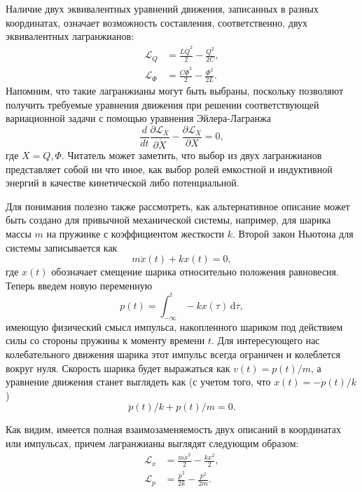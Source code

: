 \documentclass[14pt, a4paper]{extreport}
\newcommand{\diff}{\,\mathrm{d}}
\numberwithin{equation}{section}
\begin{document}
Наличие двух эквивалентных уравнений движения, записанных в разных координатах, означает возможность составления, соответственно, двух эквивалентных лагранжианов:
\begin{align}
	\mathcal{L}_Q &= \frac{L \dot Q^2}{2} - \frac{Q^2}{2 C},\\
	\mathcal{L}_\Phi &= \frac{C\dot \Phi^2}{2} - \frac{\Phi^2}{2 L}.
\end{align}
Напомним, что такие лагранжианы могут быть выбраны, поскольку позволяют получить требуемые уравнения движения при решении соответствующей вариационной задачи с помощью уравнения Эйлера-Лагранжа
\begin{equation}
\frac{d}{d t}\frac{\partial \mathcal{L}_X}{\partial \dot X} - \frac{\partial \mathcal{L}_X}{\partial X} = 0,
\end{equation}
где $X = Q, \Phi$. Читатель может заметить, что выбор из двух лагранжианов представляет собой ни что иное, как выбор ролей емкостной и индуктивной энергий в качестве кинетической либо потенциальной. 

Для понимания полезно также рассмотреть, как альтернативное описание может быть создано для привычной механической системы, например, для шарика массы $m$ на пружинке с коэффициентом жесткости $k$. Второй закон Ньютона для системы записывается как
\begin{equation}
	m \ddot x(t) + k x(t) = 0,
\end{equation}
где $x(t)$ обозначает смещение шарика относительно положения равновесия. Теперь введем новую переменную
\begin{equation}
	p(t) = \int_{-\infty}^{t} - k x(\tau) \diff \tau,
\end{equation}
имеющую физический смысл импульса, накопленного шариком под действием силы со стороны пружины к моменту времени $ t $. Для интересующего нас колебательного движения шарика этот импульс всегда ограничен и колеблется вокруг нуля. Скорость шарика будет выражаться как $v(t) = p(t)/m$, а уравнение движения станет выглядеть как (с учетом того, что $ x(t) = - \dot p(t) / k $)
\begin{equation}
	\ddot p(t)/k + p(t)/m = 0.
\end{equation}

Как видим, имеется полная взаимозаменяемость двух описаний в координатах или импульсах, причем лагранжианы выглядят следующим образом:
\begin{align}
\mathcal{L}_x &= \frac{m \dot x^2}{2} - \frac{k x^2}{2},\\
\mathcal{L}_p &= \frac{\dot p^2}{2 k} - \frac{p^2}{2 m}.\label{eq:Lp}
\end{align}
\end{document}
